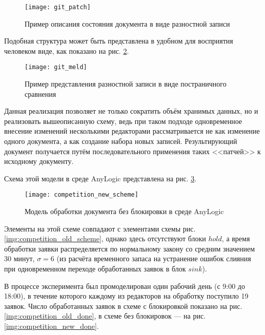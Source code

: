 \begin{figure}[h!]
  \centering
  \texttt{[image: git\_patch]}
  \caption{Пример описания состояния документа в виде разностной записи}
  \label{img:git_patch}
\end{figure}

Подобная структура может быть представлена в удобном для восприятия человеком виде, как показано на рис. \ref{img:git_meld}.
\begin{figure}[h!]
  \centering
  \texttt{[image: git\_meld]}
  \caption{Пример представления разностной записи в виде постраничного сравнения}
  \label{img:git_meld}
\end{figure}

Данная реализация позволяет не только сократить объём хранимых данных, но и реализовать вышеописанную схему, ведь при таком подходе одновременное внесение изменений несколькими редакторами рассматривается не как изменение одного документа, а как создание набора новых записей. Результирующий документ получается путём последовательного применения таких <<патчей>> к исходному документу.

\vspace{\baselineskip}
Схема этой модели в среде AnyLogic представлена на рис. \ref{img:competition_new_scheme}.

\begin{figure}[h!]
  \centering
  \texttt{[image: competition\_new\_scheme]}
  \caption{Модель обработки документа без блокировки в среде AnyLogic}
  \label{img:competition_new_scheme}
\end{figure}

\vspace{\baselineskip}
Элементы на этой схеме совпадают с элементами схемы рис. \ref{img:competition_old_scheme}, однако здесь отсутствуют блоки $hold$, а время обработки заявки распределяется по нормальному закону со средним значением 30 минут, $\sigma=6$ (из расчёта временного запаса на устранение ошибок слияния при одновременном переходе обработанных заявок в блок $sink$).

\vspace{\baselineskip}
В процессе эксперимента был промоделирован один рабочий день (с 9:00 до 18:00), в течение которого каждому из редакторов на обработку поступило 19 заявок. Число обработанных заявок в схеме с блокировкой показано на рис. \ref{img:competition_old_done}, в схеме без блокировок --- на рис. \ref{img:competition_new_done}.

